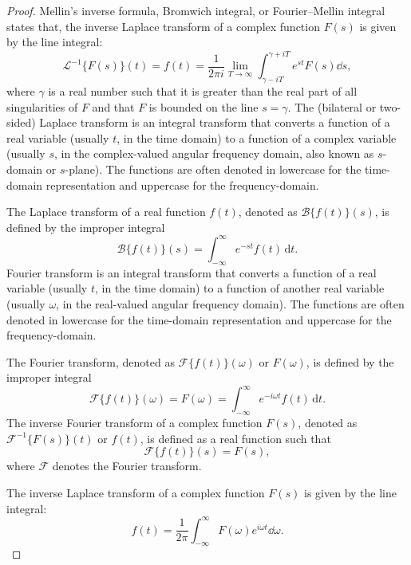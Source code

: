 \documentclass[a4paper,12pt]{report}
\begin{document}
\begin{itemize}
\begin{itemize}
\begin{proof}
Mellin's inverse formula, Bromwich integral, or Fourier–Mellin integral states that, the inverse Laplace transform of a complex function $F(s)$ is given by the line integral:
\[\mathcal{L}^{-1}\{F(s)\}(t)=f(t)=\frac{1}{2\pi i}\lim_{T\to\infty}\int_{\gamma-iT}^{\gamma+iT}e^{st}F(s)\dd{s},\]
where $\gamma$ is a real number such that it is greater than the real part of all singularities of $F$ and that $F$ is bounded on the line $s=\gamma$.
The (bilateral or two-sided) Laplace transform is an integral transform that converts a function of a real variable (usually $t$, in the time domain) to a function of a complex variable (usually $s$, in the complex-valued angular frequency domain, also known as $s$-domain or $s$-plane). The functions are often denoted in lowercase for the time-domain representation and uppercase for the frequency-domain.

The Laplace transform of a real function $f(t)$, denoted as $\mathcal{B}\{f(t)\}(s)$, is defined by the improper integral
\[\mathcal{B}\{f(t)\}(s) = \int_{-\infty}^{\infty} e^{-st} f(t)\,\mathrm{d}t.\]
Fourier transform is an integral transform that converts a function of a real variable (usually $t$, in the time domain) to a function of another real variable (usually $\omega$, in the real-valued angular frequency domain). The functions are often denoted in lowercase for the time-domain representation and uppercase for the frequency-domain.

The Fourier transform, denoted as $\mathcal{F}\{f(t)\}(\omega)$ or $F(\omega)$, is defined by the improper integral
\[\mathcal{F}\{f(t)\}(\omega) = F(\omega) = \int_{-\infty}^{\infty} e^{-i\omega t} f(t)\,\mathrm{d}t.\]
The inverse Fourier transform of a complex function $F(s)$, denoted as $\mathcal{F}^{-1}\{F(s)\}(t)$ or $f(t)$, is defined as a real function such that
\[\mathcal{F}\{f(t)\}(s) = F(s),\]
where $\mathcal {F}$ denotes the Fourier transform.

The inverse Laplace transform of a complex function $F(s)$ is given by the line integral:
\[f(t) = \frac{1}{2\pi}\int_{-\infty}^{\infty} F(\omega) e^{i\omega t}\dd{\omega} .\]




\end{proof}
\end{itemize}
\end{itemize}
\end{document}
